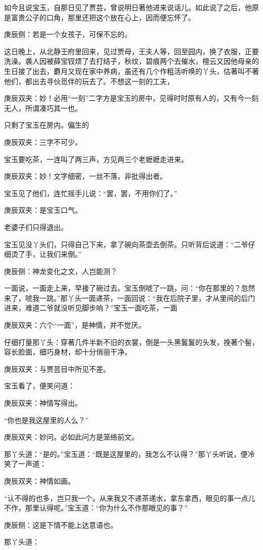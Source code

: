\begin{parag}
    如今且说宝玉，自那日见了贾芸，曾说明日著他进来说话儿。如此说了之后，他原是富贵公子的口角，那里还把这个放在心上，因而便忘怀了。\begin{note}庚辰侧：若是一个女孩子，可保不忘的。\end{note}这日晚上，从北静王府里回来，见过贾母，王夫人等，回至园内，换了衣服，正要洗澡。袭人因被薛宝钗烦了去打结子，秋纹，碧痕两个去催水，檀云又因他母亲的生日接了出去，麝月又现在家中养病，虽还有几个作粗活听唤的丫头，估著叫不著他们，都出去寻伙觅伴的玩去了。不想这一刻的工夫，\begin{note}庚辰双夹：妙！必用“一刻”二字方是宝玉的房中，见得时时原有人的，又有今一刻无人，所谓凑巧其一也。\end{note}只剩了宝玉在房内。偏生的\begin{note}庚辰双夹：三字不可少。\end{note}宝玉要吃茶，一连叫了两三声，方见两三个老嬷嬷走进来。\begin{note}庚辰双夹：妙！文字细密，一丝不落，非批得出者。\end{note}宝玉见了他们，连忙摇手儿说：“罢，罢，不用你们了。”\begin{note}庚辰双夹：是宝玉口气。\end{note}老婆子们只得退出。
\end{parag}


\begin{parag}
    宝玉见没丫头们，只得自己下来，拿了碗向茶壶去倒茶。只听背后说道：“二爷仔细烫了手，让我们来倒。”\begin{note}庚辰侧：神龙变化之文，人岂能测？\end{note}一面说，一面走上来，早接了碗过去。宝玉倒唬了一跳，问：“你在那里的？忽然来了，唬我一跳。”那丫头一面递茶，一面回说：“我在后院子里，才从里间的后门进来，难道二爷就没听见脚步响？”宝玉一面吃茶，一面\begin{note}庚辰双夹：六个“一面”，是神情，并不觉厌。\end{note}仔细打量那丫头：穿著几件半新不旧的衣裳，倒是一头黑鬒鬒的头发，挽著个髻，容长脸面，细巧身材，却十分俏丽干净。\begin{note}庚辰双夹：与贾芸目中所见不差。\end{note}宝玉看了，便笑问道：\begin{note}庚辰双夹：神情写得出。\end{note}“你也是我这屋里的人么？”\begin{note}庚辰双夹：妙问。必如此问方是笼络前文。\end{note}那丫头道：“是的。”宝玉道：“既是这屋里的，我怎么不认得？”那丫头听说，便冷笑了一声道：\begin{note}庚辰双夹：神情如画。\end{note}“认不得的也多，岂只我一个。从来我又不递茶递水，拿东拿西，眼见的事一点儿不作，那里认得呢。”宝玉道：“你为什么不作那眼见的事？”\begin{note}庚辰侧：这是下情不能上达意语也。\end{note}那丫头道：
\end{parag}


